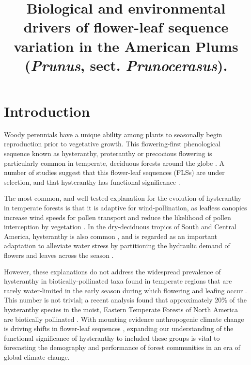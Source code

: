 \documentclass{article}[11pt]
\title{Biological and environmental drivers of flower-leaf sequence variation in the American Plums (\emph{Prunus}, sect. \emph{Prunocerasus}). }
\begin{document}

\maketitle


\section*{Introduction}
\noindent Woody perennials have a unique ability among plants to seasonally begin reproduction prior to vegetative growth. This flowering-first phenological sequence known as hysteranthy, proteranthy or precocious flowering is particularly common in temperate, deciduous forests around the globe \citep{Rathcke_1985}. A number of studies suggest that this flower-leaf sequences (FLSs) are under selection, and that hysteranthy has functional significance \citep{Gougherty2018,Buonaiuto2020,Guo2014}.

\noindent The most common, and well-tested explanation for the evolution of hysteranthy in temperate forests is that it is adaptive for wind-pollination, as leafless canopies increase wind speeds for pollen transport and reduce the likelihood of pollen interception by vegetation \citep{Whitehead1969,Niklas1985}. In the dry-deciduous tropics of South and Central America, hysteranthy is also common \citep{Rathcke_1985,Franklin2016}, and is regarded as an important adaptation to alleviate water stress by partitioning the hydraulic demand of flowers and leaves across the season \citep{Gougherty2018,Franklin2016,Borchert1983,Reich1984}.

However, these explanations do not address the widespread prevalence of hysteranthy in biotically-pollinated taxa found in temperate regions that are rarely water-limited in the early season during which flowering and leafing occur \citep{Polgar2011}. This number is not trivial; a recent analysis found that approximately 20\% of the hysteranthy species in the moist, Eastern Temperate Forests of North America are biotically pollinated \citep{Buonaiuto2020}. With mounting evidence anthropogenic climate change is driving shifts in flower-leaf sequences \citep{Ma2020:aa}, expanding our understanding of the functional significance of hysteranthy to included these groups is vital to forecasting the demography and performance of forest communities in an era of global climate change.
\end{document}
